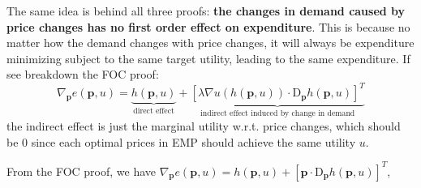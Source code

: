 The same idea is behind all three proofs: \textbf{the changes in demand caused by price changes has no first order effect on expenditure}. This is because no matter how the demand changes with price changes, it will always be expenditure minimizing subject to the same target utility, leading to the same expenditure.
If see breakdown the FOC proof:
$$ \nabla_{\mathbf{p}}e(\mathbf{p},u) = \underbrace{h(\mathbf{p},u)}_{\text{direct effect}} + \underbrace{\left[\lambda\nabla u(h(\mathbf{p},u))\cdot \mathrm{D}_{\mathbf{p}}h(\mathbf{p},u)\right]^T}_{\text{indirect effect induced by change in demand}}$$
the indirect effect is just the marginal utility w.r.t. price changes, which should be 0 since each optimal prices in EMP should achieve the same utility $u$.

From the FOC proof, we have $\nabla_{\mathbf{p}}e(\mathbf{p},u)=h(\mathbf{p},u)+\left[\mathbf{p}\cdot \mathrm{D}_{\mathbf{p}}h(\mathbf{p},u)\right]^T$, 